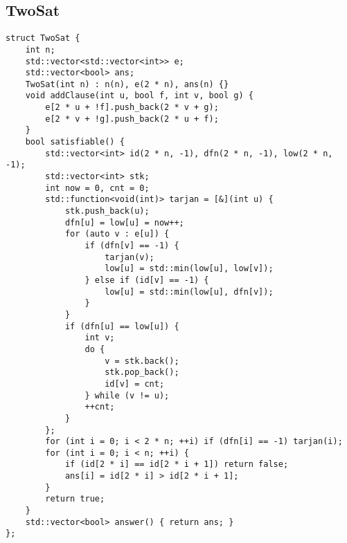 \subsection{TwoSat}
\begin{lstlisting}
struct TwoSat {
    int n;
    std::vector<std::vector<int>> e;
    std::vector<bool> ans;
    TwoSat(int n) : n(n), e(2 * n), ans(n) {}
    void addClause(int u, bool f, int v, bool g) {
        e[2 * u + !f].push_back(2 * v + g);
        e[2 * v + !g].push_back(2 * u + f);
    }
    bool satisfiable() {
        std::vector<int> id(2 * n, -1), dfn(2 * n, -1), low(2 * n, -1);
        std::vector<int> stk;
        int now = 0, cnt = 0;
        std::function<void(int)> tarjan = [&](int u) {
            stk.push_back(u);
            dfn[u] = low[u] = now++;
            for (auto v : e[u]) {
                if (dfn[v] == -1) {
                    tarjan(v);
                    low[u] = std::min(low[u], low[v]);
                } else if (id[v] == -1) {
                    low[u] = std::min(low[u], dfn[v]);
                }
            }
            if (dfn[u] == low[u]) {
                int v;
                do {
                    v = stk.back();
                    stk.pop_back();
                    id[v] = cnt;
                } while (v != u);
                ++cnt;
            }
        };
        for (int i = 0; i < 2 * n; ++i) if (dfn[i] == -1) tarjan(i);
        for (int i = 0; i < n; ++i) {
            if (id[2 * i] == id[2 * i + 1]) return false;
            ans[i] = id[2 * i] > id[2 * i + 1];
        }
        return true;
    }
    std::vector<bool> answer() { return ans; }
};
\end{lstlisting}
